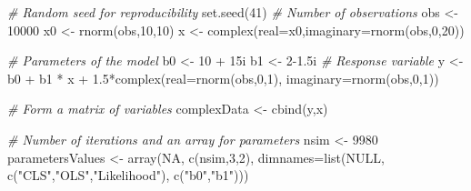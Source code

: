 \documentclass[
]{book}
\newenvironment{Shaded}{\begin{snugshade}}{\end{snugshade}}
\newcommand{\AttributeTok}[1]{\textcolor[rgb]{0.77,0.63,0.00}{#1}}
\newcommand{\CommentTok}[1]{\textcolor[rgb]{0.56,0.35,0.01}{\textit{#1}}}
\newcommand{\ConstantTok}[1]{\textcolor[rgb]{0.00,0.00,0.00}{#1}}
\newcommand{\DecValTok}[1]{\textcolor[rgb]{0.00,0.00,0.81}{#1}}
\newcommand{\FloatTok}[1]{\textcolor[rgb]{0.00,0.00,0.81}{#1}}
\newcommand{\FunctionTok}[1]{\textcolor[rgb]{0.00,0.00,0.00}{#1}}
\newcommand{\NormalTok}[1]{#1}
\newcommand{\OtherTok}[1]{\textcolor[rgb]{0.56,0.35,0.01}{#1}}
\newcommand{\SpecialCharTok}[1]{\textcolor[rgb]{0.00,0.00,0.00}{#1}}
\newcommand{\StringTok}[1]{\textcolor[rgb]{0.31,0.60,0.02}{#1}}
\begin{document}
\begin{Shaded}
\begin{Highlighting}[]
\CommentTok{\# Random seed for reproducibility}
\FunctionTok{set.seed}\NormalTok{(}\DecValTok{41}\NormalTok{)}
\CommentTok{\# Number of observations}
\NormalTok{obs }\OtherTok{\textless{}{-}} \DecValTok{10000}
\NormalTok{x0 }\OtherTok{\textless{}{-}} \FunctionTok{rnorm}\NormalTok{(obs,}\DecValTok{10}\NormalTok{,}\DecValTok{10}\NormalTok{)}
\NormalTok{x }\OtherTok{\textless{}{-}} \FunctionTok{complex}\NormalTok{(}\AttributeTok{real=}\NormalTok{x0,}\AttributeTok{imaginary=}\FunctionTok{rnorm}\NormalTok{(obs,}\DecValTok{0}\NormalTok{,}\DecValTok{20}\NormalTok{))}

\CommentTok{\# Parameters of the model}
\NormalTok{b0 }\OtherTok{\textless{}{-}} \DecValTok{10} \SpecialCharTok{+}\NormalTok{ 15i}
\NormalTok{b1 }\OtherTok{\textless{}{-}} \DecValTok{2}\FloatTok{{-}1.5}\NormalTok{i}
\CommentTok{\# Response variable}
\NormalTok{y }\OtherTok{\textless{}{-}}\NormalTok{ b0 }\SpecialCharTok{+}\NormalTok{ b1 }\SpecialCharTok{*}\NormalTok{ x }\SpecialCharTok{+} \FloatTok{1.5}\SpecialCharTok{*}\FunctionTok{complex}\NormalTok{(}\AttributeTok{real=}\FunctionTok{rnorm}\NormalTok{(obs,}\DecValTok{0}\NormalTok{,}\DecValTok{1}\NormalTok{),}
                               \AttributeTok{imaginary=}\FunctionTok{rnorm}\NormalTok{(obs,}\DecValTok{0}\NormalTok{,}\DecValTok{1}\NormalTok{))}

\CommentTok{\# Form a matrix of variables}
\NormalTok{complexData }\OtherTok{\textless{}{-}} \FunctionTok{cbind}\NormalTok{(y,x)}

\CommentTok{\# Number of iterations and an array for parameters}
\NormalTok{nsim }\OtherTok{\textless{}{-}} \DecValTok{9980}
\NormalTok{parametersValues }\OtherTok{\textless{}{-}}
    \FunctionTok{array}\NormalTok{(}\ConstantTok{NA}\NormalTok{, }\FunctionTok{c}\NormalTok{(nsim,}\DecValTok{3}\NormalTok{,}\DecValTok{2}\NormalTok{),}
          \AttributeTok{dimnames=}\FunctionTok{list}\NormalTok{(}\ConstantTok{NULL}\NormalTok{,}
                        \FunctionTok{c}\NormalTok{(}\StringTok{"CLS"}\NormalTok{,}\StringTok{"OLS"}\NormalTok{,}\StringTok{"Likelihood"}\NormalTok{),}
                        \FunctionTok{c}\NormalTok{(}\StringTok{"b0"}\NormalTok{,}\StringTok{"b1"}\NormalTok{)))}


\end{Highlighting}
\end{Shaded}
\end{document}
